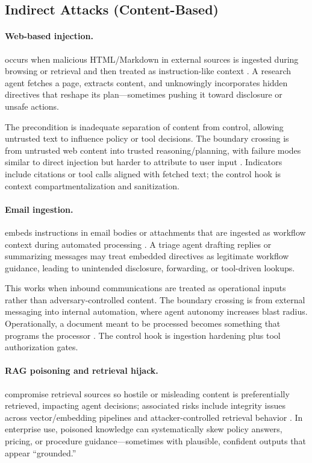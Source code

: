 \begin{TNtwocol}
  \section{Indirect Attacks (Content-Based)}

  \paragraph{Web-based injection.} occurs when malicious HTML/Markdown in external sources is ingested during browsing or retrieval and then treated as instruction-like context \cite{owasp-prompt-injection-cheatsheet,owasp-top10-llm-2025}. A research agent fetches a page, extracts content, and unknowingly incorporates hidden directives that reshape its plan—sometimes pushing it toward disclosure or unsafe actions.

  The precondition is inadequate separation of content from control, allowing untrusted text to influence policy or tool decisions. The boundary crossing is from untrusted web content into trusted reasoning/planning, with failure modes similar to direct injection but harder to attribute to user input \cite{owasp-prompt-injection-cheatsheet,owasp-top10-llm-2025}. Indicators include citations or tool calls aligned with fetched text; the control hook is context compartmentalization and sanitization.

  \paragraph{Email ingestion.} embeds instructions in email bodies or attachments that are ingested as workflow context during automated processing \cite{owasp-prompt-injection-cheatsheet,owasp-top10-llm-2025}. A triage agent drafting replies or summarizing messages may treat embedded directives as legitimate workflow guidance, leading to unintended disclosure, forwarding, or tool-driven lookups.

  This works when inbound communications are treated as operational inputs rather than adversary-controlled content. The boundary crossing is from external messaging into internal automation, where agent autonomy increases blast radius. Operationally, a document meant to be processed becomes something that programs the processor \cite{owasp-prompt-injection-cheatsheet,owasp-top10-llm-2025}. The control hook is ingestion hardening plus tool authorization gates.

  \paragraph{RAG poisoning and retrieval hijack.} compromise retrieval sources so hostile or misleading content is preferentially retrieved, impacting agent decisions; associated risks include integrity issues across vector/embedding pipelines and attacker-controlled retrieval behavior \cite{owasp-top10-llm-2025,nist-genai-600-1}. In enterprise use, poisoned knowledge can systematically skew policy answers, pricing, or procedure guidance—sometimes with plausible, confident outputs that appear “grounded.”


\end{TNtwocol}

